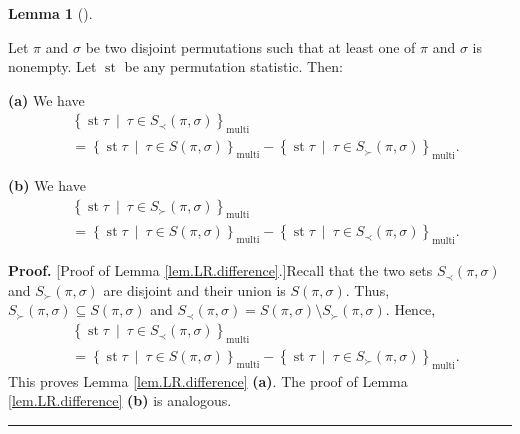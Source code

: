 \documentclass[numbers=enddot,12pt,final,onecolumn,notitlepage]{scrartcl}%
\theoremstyle{definition}
\newtheorem{lem}[theo]{Lemma}
\newenvironment{lemma}[1][]
{\begin{lem}[#1]\begin{leftbar}}
{\end{leftbar}\end{lem}}
\newenvironment{proof}[1][Proof]{\noindent\textbf{#1.} }{\ \rule{0.5em}{0.5em}}
\begin{document}
\begin{lemma}
\label{lem.LR.difference}Let $\pi$ and $\sigma$ be two disjoint permutations
such that at least one of $\pi$ and $\sigma$ is nonempty. Let
$\operatorname{st}$ be any permutation statistic. Then:

\textbf{(a)} We have%
\begin{align*}
&  \left\{  \operatorname{st} \tau   \ \mid\ \tau\in S_{\prec
}\left(  \pi,\sigma\right)  \right\}  _{\operatorname*{multi}}\\
&  =\left\{  \operatorname{st} \tau   \ \mid\ \tau\in S\left(
\pi,\sigma\right)  \right\}  _{\operatorname*{multi}}-\left\{
\operatorname{st} \tau   \ \mid\ \tau\in S_{\succ}\left(
\pi,\sigma\right)  \right\}  _{\operatorname*{multi}}.
\end{align*}


\textbf{(b)} We have%
\begin{align*}
&  \left\{  \operatorname{st} \tau   \ \mid\ \tau\in S_{\succ
}\left(  \pi,\sigma\right)  \right\}  _{\operatorname*{multi}}\\
&  =\left\{  \operatorname{st} \tau   \ \mid\ \tau\in S\left(
\pi,\sigma\right)  \right\}  _{\operatorname*{multi}}-\left\{
\operatorname{st} \tau   \ \mid\ \tau\in S_{\prec}\left(
\pi,\sigma\right)  \right\}  _{\operatorname*{multi}}.
\end{align*}

\end{lemma}

\begin{proof}
[Proof of Lemma \ref{lem.LR.difference}.]Recall that the two sets $S_{\prec
}\left(  \pi,\sigma\right)  $ and $S_{\succ}\left(  \pi,\sigma\right)  $ are
disjoint and their union is $S\left(  \pi,\sigma\right)  $. Thus, $S_{\succ
}\left(  \pi,\sigma\right)  \subseteq S\left(  \pi,\sigma\right)  $ and
$S_{\prec}\left(  \pi,\sigma\right)  =S\left(  \pi,\sigma\right)  \setminus
S_{\succ}\left(  \pi,\sigma\right)  $. Hence,%
\begin{align*}
&  \left\{  \operatorname{st} \tau   \ \mid\ \tau\in S_{\prec
}\left(  \pi,\sigma\right)  \right\}  _{\operatorname*{multi}}\\
&  =\left\{  \operatorname{st} \tau   \ \mid\ \tau\in S\left(
\pi,\sigma\right)  \right\}  _{\operatorname*{multi}}-\left\{
\operatorname{st} \tau   \ \mid\ \tau\in S_{\succ}\left(
\pi,\sigma\right)  \right\}  _{\operatorname*{multi}}.
\end{align*}
This proves Lemma \ref{lem.LR.difference} \textbf{(a)}. The proof of Lemma
\ref{lem.LR.difference} \textbf{(b)} is analogous.
\end{proof}
\end{document}
